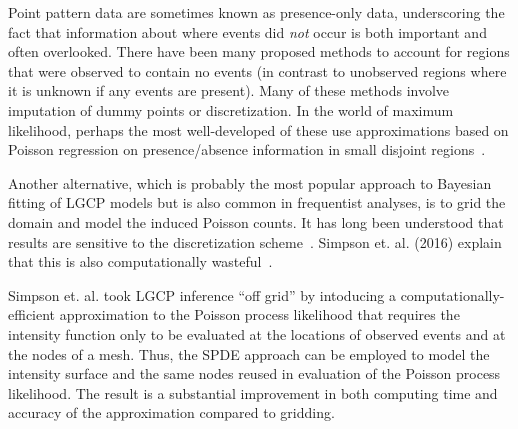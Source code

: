 \documentclass[]{interact}
\begin{document}
Point pattern data are sometimes known as presence-only data, underscoring
the fact that information about where events did \emph{not} occur is both
important and often overlooked. There have been many proposed methods to
account for regions that were observed to contain no events (in contrast to
unobserved regions where it is unknown if any events are present). Many of
these methods involve imputation of dummy points or discretization. In the
world of maximum likelihood, perhaps the most well-developed of these use
approximations based on Poisson regression on presence/absence information in
small disjoint regions~\cite{bermanturner,baddeleyturner}.

Another alternative, which is probably the most popular approach to Bayesian
fitting of LGCP models but is also common in frequentist analyses, is to grid
the domain and model the induced Poisson counts. It has long been understood
that results are sensitive to the discretization scheme~\cite{brixmoeller}.
Simpson et. al. (2016) explain that this is also computationally
wasteful~\cite{simpsonetal}.


Simpson et. al. took LGCP inference ``off grid'' by intoducing a
computationally-efficient approximation to the Poisson process likelihood that
requires the intensity function only to be evaluated at the locations of
observed events and at the nodes of a mesh. Thus, the SPDE approach can be
employed to model the intensity surface and the same nodes reused in
evaluation of the Poisson process likelihood. The result is a substantial
improvement in both computing time and accuracy of the approximation compared
to gridding.

\end{document}

